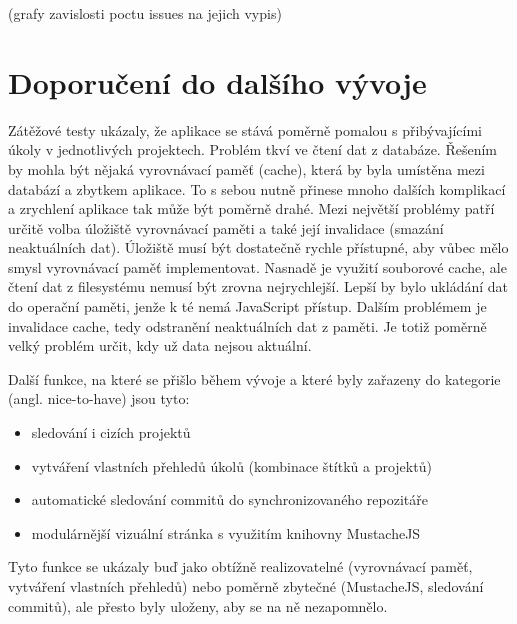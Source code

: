 (grafy zavislosti poctu issues na jejich vypis)

\section{Doporučení do dalšího vývoje}

Zátěžové testy ukázaly, že aplikace se stává poměrně pomalou s přibývajícími úkoly v jednotlivých projektech. Problém tkví ve čtení dat z databáze. Řešením by mohla být nějaká vyrovnávací paměť (cache), která by byla umístěna mezi databází a zbytkem aplikace. To s sebou nutně přinese mnoho dalších komplikací a zrychlení aplikace tak může být poměrně drahé. Mezi největší problémy patří určitě volba úložiště vyrovnávací paměti a také její invalidace (smazání neaktuálních dat). Úložiště musí být dostatečně rychle přístupné, aby vůbec mělo smysl vyrovnávací paměť implementovat. Nasnadě je využití souborové cache, ale čtení dat z filesystému nemusí být zrovna nejrychlejší. Lepší by bylo ukládání dat do operační paměti, jenže k té nemá JavaScript přístup. Dalším problémem je invalidace cache, tedy odstranění neaktuálních dat z paměti. Je totiž poměrně velký problém určit, kdy už data nejsou aktuální.

Další funkce, na které se přišlo během vývoje a které byly zařazeny do kategorie  (angl. nice-to-have) jsou tyto:

\begin{itemize}
\item sledování i cizích projektů
\item vytváření vlastních přehledů úkolů (kombinace štítků a projektů)
\item automatické sledování commitů do synchronizovaného repozitáře
\item modulárnější vizuální stránka s využitím knihovny MustacheJS
\end{itemize}

Tyto funkce se ukázaly buď jako obtížně realizovatelné (vyrovnávací paměť, vytváření vlastních přehledů) nebo poměrně zbytečné (MustacheJS, sledování commitů), ale přesto byly uloženy, aby se na ně nezapomnělo.